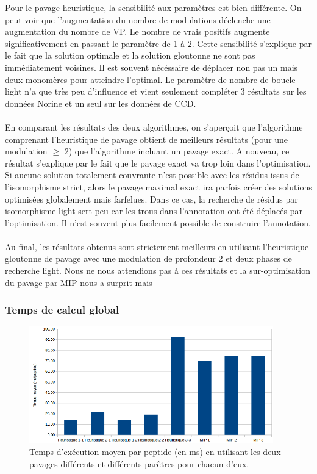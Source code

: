 \documentclass[12pt,french,twoside]{report}
\begin{document}
Pour le pavage heuristique, la sensibilité aux paramètres est bien différente.
On peut voir que l'augmentation du nombre de modulations déclenche une augmentation du nombre de VP.
Le nombre de vrais positifs augmente significativement en passant le paramètre de 1 à 2.
Cette sensibilité s'explique par le fait que la solution optimale et la solution gloutonne ne sont pas immédiatement voisines.
Il est souvent nécéssaire de déplacer non pas un mais deux monomères pour atteindre l'optimal.
Le paramètre de nombre de boucle light n'a que très peu d'influence et vient seulement compléter 3 résultats sur les données Norine et un seul sur les données de CCD.

\paragraph{}En comparant les résultats des deux algorithmes, on s'aperçoit que l'algorithme comprenant l'heuristique de pavage obtient de meilleurs résultats (pour une modulation $\ge$ 2) que l'algorithme incluant un pavage exact.
A nouveau, ce résultat s'explique par le fait que le pavage exact va trop loin dans l'optimisation.
Si aucune solution totalement couvrante n'est possible avec les résidus issus de l'isomorphisme strict, alors le pavage maximal exact ira parfois créer des solutions optimisées globalement mais farfelues.
Dans ce cas, la recherche de résidus par isomorphisme light sert peu car les trous dans l'annotation ont été déplacés par l'optimisation.
Il n'est souvent plus facilement possible de construire l'annotation.

\paragraph{}Au final, les résultats obtenus sont strictement meilleurs en utilisant l'heuristique gloutonne de pavage avec une modulation de profondeur 2 et deux phases de recherche light.
Nous ne nous attendions pas à ces résultats et la sur-optimisation du pavage par MIP nous a surprit mais 


\subsubsection{Temps de calcul global}

\begin{figure}[!ht]
  \begin{center}
    \includegraphics[width=400px]{Figures/s2m/results/temps.png}
    \caption{\label{temps_general}Temps d'exécution moyen par peptide (en ms) en utilisant les deux pavages différents et différents parêtres pour chacun d'eux.}
  \end{center}
\end{figure}
\end{document}

